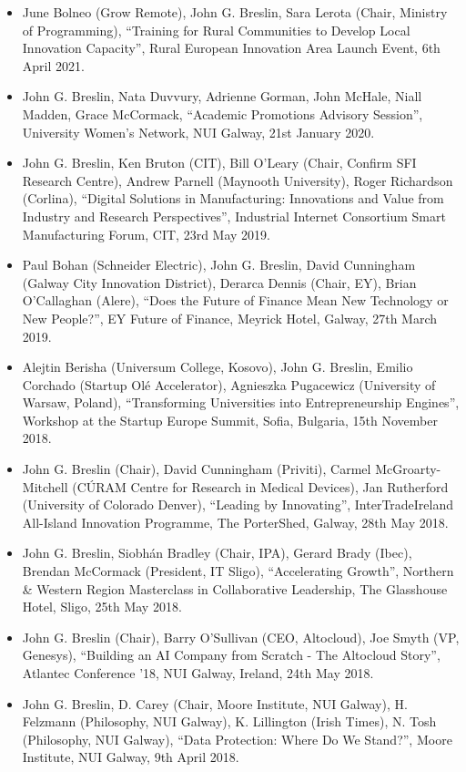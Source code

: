 \documentclass[10pt,a4paper]{res} %
\begin{document}
\begin{resume}
\begin{itemize}
\item June Bolneo (Grow Remote), John G. Breslin, Sara Lerota (Chair, Ministry of Programming), ``Training for Rural Communities to Develop Local Innovation Capacity'', Rural European Innovation Area Launch Event, 6th April 2021.
\item John G. Breslin, Nata Duvvury, Adrienne Gorman, John McHale, Niall Madden, Grace McCormack, ``Academic Promotions Advisory Session'', University Women's Network, NUI Galway, 21st January 2020.
\item John G. Breslin, Ken Bruton (CIT), Bill O’Leary (Chair, Confirm SFI Research Centre), Andrew Parnell (Maynooth University), Roger Richardson (Corlina), ``Digital Solutions in Manufacturing: Innovations and Value from Industry and Research Perspectives'', Industrial Internet Consortium Smart Manufacturing Forum, CIT, 23rd May 2019.
\item Paul Bohan (Schneider Electric), John G. Breslin, David Cunningham (Galway City Innovation District), Derarca Dennis (Chair, EY), Brian O’Callaghan (Alere), ``Does the Future of Finance Mean New Technology or New People?'', EY Future of Finance, Meyrick Hotel, Galway, 27th March 2019.
\item Alejtin Berisha (Universum College, Kosovo), John G. Breslin, Emilio Corchado (Startup Ol\'{e} Accelerator), Agnieszka Pugacewicz (University of Warsaw, Poland), ``Transforming Universities into Entrepreneurship Engines'', Workshop at the Startup Europe Summit, Sofia, Bulgaria, 15th November 2018.
\item John G. Breslin (Chair), David Cunningham (Priviti), Carmel McGroarty-Mitchell (C\'{U}RAM Centre for Research in Medical Devices), Jan Rutherford (University of Colorado Denver), ``Leading by Innovating'', InterTradeIreland All-Island Innovation Programme, The PorterShed, Galway, 28th May 2018.
\item John G. Breslin, Siobh\'{a}n Bradley (Chair, IPA), Gerard Brady (Ibec), Brendan McCormack (President, IT Sligo), ``Accelerating Growth'', Northern \& Western Region Masterclass in Collaborative Leadership, The Glasshouse Hotel, Sligo, 25th May 2018.
\item John G. Breslin (Chair), Barry O'Sullivan (CEO, Altocloud), Joe Smyth (VP, Genesys), ``Building an AI Company from Scratch - The Altocloud Story'', Atlantec Conference '18, NUI Galway, Ireland, 24th May 2018.
\item John G. Breslin, D. Carey (Chair, Moore Institute, NUI Galway), H. Felzmann (Philosophy, NUI Galway), K. Lillington (Irish Times), N. Tosh (Philosophy, NUI Galway), ``Data Protection: Where Do We Stand?'', Moore Institute, NUI Galway, 9th April 2018.

\end{itemize}
\end{resume}
\end{document}
